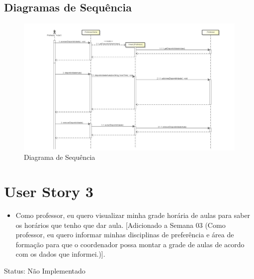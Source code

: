 \documentclass{abnt}
\begin{document}
		\FloatBarrier
		\begin{landscape}
		\subsection{Diagramas de Sequência}
						\begin{figure}[h]
							\begin{center}
							\includegraphics[width=500px]{SequenceDisponibilidade}
							\caption{Diagrama de Sequência}
							\label{fig:SequenceDisponibilidade}
							\end{center}				
						\end{figure}
						\FloatBarrier
		\end{landscape}
			
	\clearpage
	\section{User Story 3}

		\begin{itemize}
			\item Como professor, eu quero visualizar minha grade horária de aulas para saber os horários que tenho que dar aula.
			[Adicionado a Semana 03 (Como professor, eu quero informar minhas disciplinas de preferência e área de formação para que o coordenador 
			possa montar a grade de aulas de acordo com os dados que informei.)].
		\end{itemize}
		
		Status: Não Implementado
		
\end{document}
